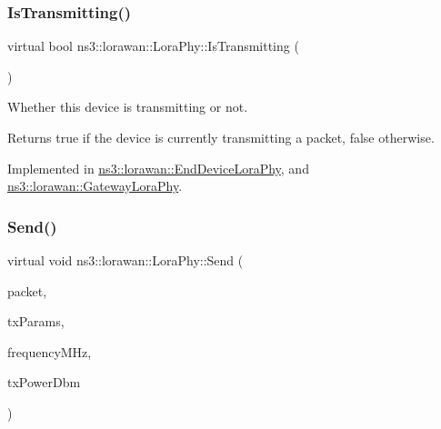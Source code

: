 \mbox{\label{classns3_1_1lorawan_1_1LoraPhy_a5280764d934ba5ff8d305b0bc6b600ce}} 
\subsubsection{\texorpdfstring{Is\+Transmitting()}{IsTransmitting()}}
{\footnotesize\ttfamily virtual bool ns3\+::lorawan\+::\+Lora\+Phy\+::\+Is\+Transmitting (\begin{DoxyParamCaption}\item[{void}]{ }\end{DoxyParamCaption})\hspace{0.3cm}{\ttfamily [pure virtual]}}

Whether this device is transmitting or not.

\begin{DoxyReturn}{Returns}
true if the device is currently transmitting a packet, false otherwise. 
\end{DoxyReturn}


Implemented in \hyperlink{classns3_1_1lorawan_1_1EndDeviceLoraPhy_a3925d5a27b7e1352c04a78f008071d23}{ns3\+::lorawan\+::\+End\+Device\+Lora\+Phy}, and \hyperlink{classns3_1_1lorawan_1_1GatewayLoraPhy_a9184985bc4da2d1c0cc9fedb105b20f8}{ns3\+::lorawan\+::\+Gateway\+Lora\+Phy}.

\mbox{\label{classns3_1_1lorawan_1_1LoraPhy_a2b940beff4a2fbfb2e603d5d9e65d863}} 
\subsubsection{\texorpdfstring{Send()}{Send()}}
{\footnotesize\ttfamily virtual void ns3\+::lorawan\+::\+Lora\+Phy\+::\+Send (\begin{DoxyParamCaption}\item[{Ptr$<$ Packet $>$}]{packet,  }\item[{\hyperlink{structns3_1_1lorawan_1_1LoraTxParameters}{Lora\+Tx\+Parameters}}]{tx\+Params,  }\item[{double}]{frequency\+M\+Hz,  }\item[{double}]{tx\+Power\+Dbm }\end{DoxyParamCaption})\hspace{0.3cm}{\ttfamily [pure virtual]}}

